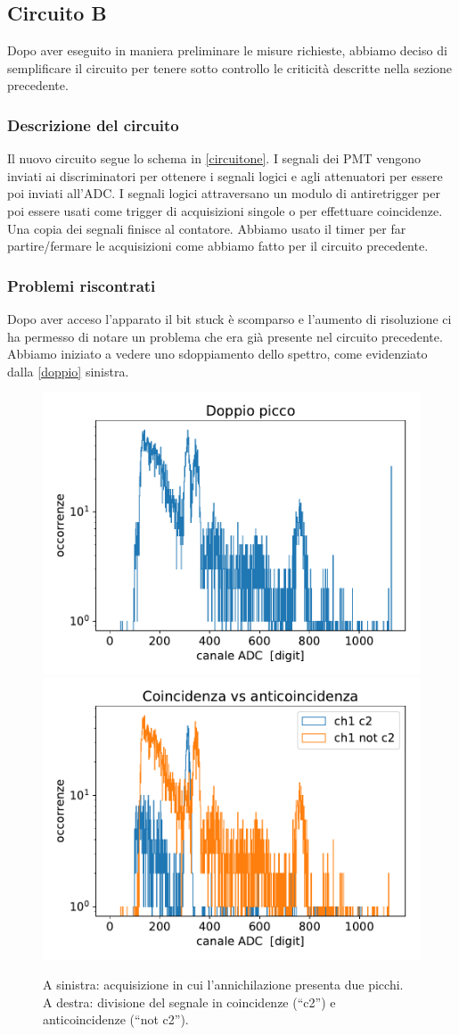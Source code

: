 \subsection{Circuito B}

Dopo aver eseguito in maniera preliminare le misure richieste, abbiamo deciso di semplificare il circuito per tenere sotto controllo le criticità descritte nella sezione precedente.

\subsubsection{Descrizione del circuito}

Il nuovo circuito segue lo schema in \autoref{circuitone}.
I segnali dei PMT vengono inviati ai discriminatori per ottenere i segnali logici e agli attenuatori per essere poi inviati all'ADC. I segnali logici attraversano un modulo di antiretrigger per poi essere usati come trigger di acquisizioni singole o per effettuare coincidenze. Una copia dei segnali finisce al contatore. Abbiamo usato il timer per far partire/fermare le acquisizioni come abbiamo fatto per il circuito precedente.

\subsubsection{Problemi riscontrati}
\label{ref}
Dopo aver acceso l'apparato il bit stuck è scomparso e l'aumento di risoluzione ci ha permesso di notare un problema che era già presente nel circuito precedente. Abbiamo iniziato a vedere uno sdoppiamento dello spettro, come evidenziato dalla \autoref{doppio} sinistra. 

\begin{figure}[h]
\centering
\subfloat
{
\includegraphics[width=18 em]{immagini/doppio}
}
\subfloat
{
\includegraphics[width=18 em]{immagini/sdoppio}
}
\caption{A sinistra: acquisizione in cui l'annichilazione presenta due picchi.\\
A destra: divisione del segnale in coincidenze (``c2'') e anticoincidenze (``not c2'').}
\label{doppio}
\end{figure}

